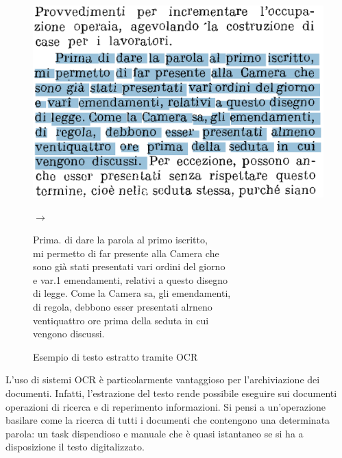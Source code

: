 \begin{figure}[H]
\centering
{
\begin{minipage}{0.4\textwidth}
\includegraphics[width=\textwidth]{immagini/metodologia/ocr_ex.png}
\end{minipage} \hfill
\begin{minipage}{0.06\textwidth}
\Large$\rightarrow$
\end{minipage}
\begin{minipage}{0.5\textwidth}
\footnotesize	
Prima. di dare la parola al primo iscritto, \\
mi permetto di far presente alla Camera che \\
sono già stati presentati vari ordini del giorno \\
e var.1 emendamenti, relativi a questo disegno \\
di legge. Come la Camera sa, gli emendamenti, \\
di regola, debbono esser presentati alrneno \\
ventiquattro ore prima della seduta in cui \\
vengono discussi.
\end{minipage}
\caption{Esempio di testo estratto tramite OCR}
\label{fig:met_ocr_esempio}
}
\end{figure}

L'uso di sistemi OCR è particolarmente vantaggioso per l'archiviazione dei documenti. Infatti, l'estrazione del testo rende possibile eseguire sui documenti operazioni di ricerca e di reperimento informazioni. Si pensi a un'operazione basilare come la ricerca di tutti i documenti che contengono una determinata parola: un task dispendioso e manuale che è quasi istantaneo se si ha a disposizione il testo digitalizzato.
